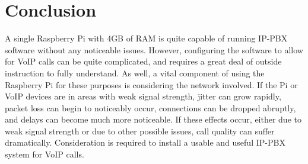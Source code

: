 \section{Conclusion} \label{sec:conclusion}
    A single Raspberry Pi with 4GB of RAM is quite capable of running IP-PBX software without any noticeable issues. However, configuring the software to allow for VoIP calls can be quite complicated, and requires a great deal of outside instruction to fully understand. As well, a vital component of using the Raspberry Pi for these purposes is considering the network involved. If the Pi or VoIP devices are in areas with weak signal strength, jitter can grow rapidly, packet loss can begin to noticeably occur, connections can be dropped abruptly, and delays can become much more noticeable. If these effects occur, either due to weak signal strength or due to other possible issues, call quality can suffer dramatically. Consideration is required to install a usable and useful IP-PBX system for VoIP calls.